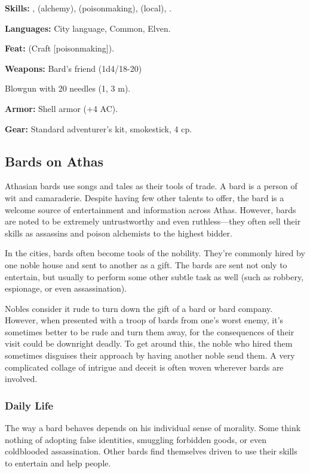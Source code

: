 \textbf{Skills:} ,  (alchemy),  (poisonmaking),  (local), .

\textbf{Languages:} City language, Common, Elven.

\textbf{Feat:}  (Craft [poisonmaking]).

\textbf{Weapons:} Bard's friend (1d4/18-20)

Blowgun with 20 needles (1, 3 m).

\textbf{Armor:} Shell armor (+4 AC).

\textbf{Gear:} Standard adventurer's kit, smokestick, 4 cp.


\subsection{Bards on Athas}

Athasian bards use songs and tales as their tools of trade. A bard is a person of wit and camaraderie. Despite having few other talents to offer, the bard is a welcome source of entertainment and information across Athas. However, bards are noted to be extremely untrustworthy and even ruthless---they often sell their skills as assassins and poison alchemists to the highest bidder.

In the cities, bards often become tools of the nobility. They're commonly hired by one noble house and sent to another as a gift. The bards are sent not only to entertain, but usually to perform some other subtle task as well (such as robbery, espionage, or even assassination).

Nobles consider it rude to turn down the gift of a bard or bard company. However, when presented with a troop of bards from one's worst enemy, it's sometimes better to be rude and turn them away, for the consequences of their visit could be downright deadly. To get around this, the noble who hired them sometimes disguises their approach by having another noble send them. A very complicated collage of intrigue and deceit is often woven wherever bards are involved.

\subsubsection{Daily Life}
The way a bard behaves depends on his individual sense of morality. Some think nothing of adopting false identities, smuggling forbidden goods, or even coldblooded assassination. Other bards find themselves driven to use their skills to entertain and help people.

